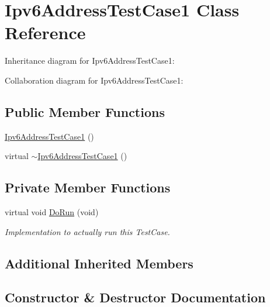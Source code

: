 \hypertarget{classIpv6AddressTestCase1}{}\section{Ipv6\+Address\+Test\+Case1 Class Reference}
\label{classIpv6AddressTestCase1}


Inheritance diagram for Ipv6\+Address\+Test\+Case1\+:


Collaboration diagram for Ipv6\+Address\+Test\+Case1\+:
\subsection*{Public Member Functions}
\begin{DoxyCompactItemize}
\item 
\hyperlink{classIpv6AddressTestCase1_a08be16b19e4b4b10f629de61e7f85228}{Ipv6\+Address\+Test\+Case1} ()
\item 
virtual \hyperlink{classIpv6AddressTestCase1_a1c4cc6e73a79109b85379cf04a06603c}{$\sim$\+Ipv6\+Address\+Test\+Case1} ()
\end{DoxyCompactItemize}
\subsection*{Private Member Functions}
\begin{DoxyCompactItemize}
\item 
virtual void \hyperlink{classIpv6AddressTestCase1_aabfe4eb98b26497f106de0bd7d62344c}{Do\+Run} (void)
\begin{DoxyCompactList}\small\item\em Implementation to actually run this Test\+Case. \end{DoxyCompactList}\end{DoxyCompactItemize}
\subsection*{Additional Inherited Members}


\subsection{Constructor \& Destructor Documentation}

